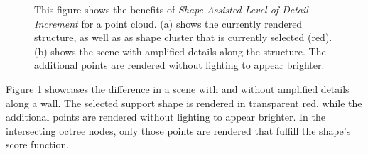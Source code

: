 \begin{figure}
\centering
{}\par\medskip
{}
\caption[Comparison of a scene with and without Shape-Assisted Level-of-Detail Increment.]
{This figure shows the benefits of \textit{Shape-Assisted Level-of-Detail Increment} for a point cloud. (a) shows the currently rendered structure, as well as as shape cluster that is currently selected (red). (b) shows the scene with amplified details along the structure. The additional points are rendered without lighting to appear brighter.}
\label{fig:lod_increment}
\end{figure}

Figure \ref{fig:lod_increment} showcases the difference in a scene with and without amplified details along a wall. The selected support shape is rendered in transparent red, while the additional points are rendered without lighting to appear brighter. In the intersecting octree nodes, only those points are rendered that fulfill the shape's score function. 


